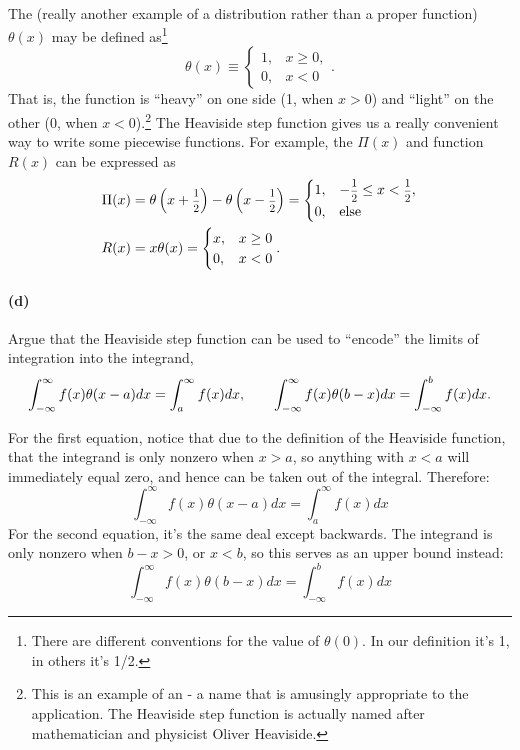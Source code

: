\documentclass{article}
\begin{document}
\paragraph{}
The 
(really another example of a distribution rather than a proper function) $\theta(x)$ may be defined as\footnote{There are different conventions for the value of $\theta(0)$.  
In our definition it's 1, in others it's 1/2.}
	\begin{equation*}
		\theta(x) \equiv \begin{cases} 1, & x\geq 0,\\ 0, & x<0\end{cases}.
	\end{equation*}
That is, the function is ``heavy'' on one side (1, when $x>0$) and ``light'' on the other (0, when $x<0$).\footnote{This is an example of an  - a name that is amusingly appropriate
to the application.  The Heaviside step function is actually named after mathematician and physicist Oliver Heaviside.} 
The Heaviside step function gives us a really convenient way to write some piecewise functions.  For example, the  $\Pi(x)$ and 
 function $R(x)$ can be expressed as
	\begin{align*}
		\Pi(x) &= \theta\left(x+\fracsm{1}{2}\right) - \theta\left(x-\fracsm{1}{2}\right) = \begin{cases} 1, & -\fracsm{1}{2} \leq x < \fracsm{1}{2},\\
		0, & \textrm{else}\end{cases}\\
		R(x) &= x\theta(x) = \begin{cases} x, & x\geq 0\\ 0, & x<0\end{cases}.
	\end{align*}

\paragraph{(d)}
Argue that the Heaviside step function can be used to ``encode'' the limits of integration into the integrand,
	\begin{equation*}
		\int_{-\infty}^{\infty} f(x)\theta(x-a)dx = \int_{a}^{\infty}f(x)dx,	\qquad
		\int_{-\infty}^{\infty} f(x)\theta(b-x)dx = \int_{-\infty}^{b}f(x)dx.
	\end{equation*}

	\begin{solution}
		For the first equation, notice that due to the definition of the Heaviside function, that 
		the integrand is only nonzero when $x > a$, so anything with $x < a$ will immediately equal zero, 
		and hence can be taken out of the integral. Therefore:
		\[
			\int_{-\infty}^\infty f(x) \theta(x - a) dx = \int_a^\infty f(x) dx 
		\] 
		For the second equation, it's the same deal except backwards. The integrand is only nonzero when 
		$b - x > 0$, or $x < b$, so this serves as an upper bound instead:
		\[
			\int_{-\infty}^\infty f(x) \theta(b - x) dx = \int_{-\infty}^b f(x) dx 
		\] 
	\end{solution}
\phline
\end{document}
